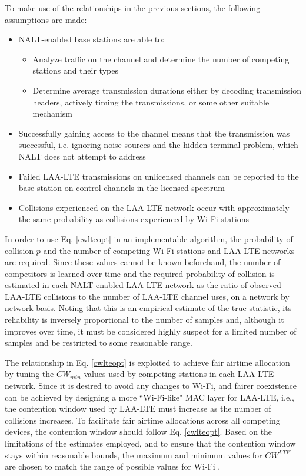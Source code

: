 To make use of the relationships in the previous sections, the following assumptions are made:
\begin{itemize}
	\item NALT-enabled base stations are able to:
	\begin{itemize}
	\item Analyze traffic on the channel and determine the number of competing stations and their types
	\item Determine average transmission durations either by decoding transmission headers, actively timing the transmissions, or some other suitable mechanism
	\end{itemize} 
	\item Successfully gaining access to the channel means that the transmission was successful, i.e. ignoring noise sources and the hidden terminal problem, which NALT does not attempt to address
	\item Failed \mbox{LAA-LTE} transmissions on unlicensed channels can be reported to the base station on control channels in the licensed spectrum
	\item Collisions experienced on the LAA-LTE network occur with approximately the same probability as collisions experienced by Wi-Fi stations
\end{itemize}

In order to use Eq. \ref{cwlteopt} in an implementable algorithm, the probability of collision  $p$ and the number of competing Wi-Fi stations and LAA-LTE networks are required. Since these values cannot be known beforehand, the number of competitors is learned over time and the required probability of collision is estimated in each NALT-enabled LAA-LTE network as the ratio of observed \mbox{LAA-LTE} collisions to the number of \mbox{LAA-LTE} channel uses, on a network by network basis.  Noting that this is an empirical estimate of the true statistic, its reliability is inversely proportional to the number of samples and, although it improves over time, it must be considered highly suspect for a limited number of samples and be restricted to some reasonable range. 

The relationship in Eq. \ref{cwlteopt} is exploited to achieve fair airtime allocation by tuning the $CW_{min}$ values used by competing stations in each LAA-LTE network.  Since it is desired to avoid any changes to \mbox{Wi-Fi}, and fairer coexistence can be achieved by designing a more \mbox{``\mbox{Wi-Fi}-like"} MAC layer for \mbox{LAA-LTE}, i.e., the contention window used by \mbox{LAA-LTE} must increase as the number of collisions increases.  To facilitate fair airtime allocations across all competing devices, the contention window should follow Eq. \ref{cwlteopt}.  Based on the limitations of the estimates employed, and to ensure that the contention window stays within reasonable bounds, the maximum and minimum values for $CW^{LTE}$ are chosen to match the range of possible values for \mbox{Wi-Fi} \cite{80211}.  

